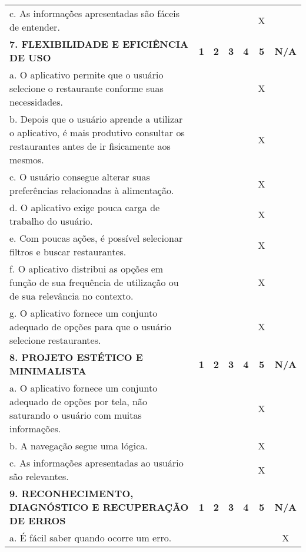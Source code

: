 \documentclass[portuguese,oneside]{tcc}
\begin{document}
\begin{center}
\begin{longtabu}{|L{25em}|c|c|c|c|c|c|}
																											c. As informações apresentadas são fáceis de entender. & & & & & X & \\ 
																											\textbf{7. FLEXIBILIDADE E EFICIÊNCIA DE USO} & \textbf{1} & \textbf{2} & \textbf{3} & \textbf{4} & \textbf{5} & \textbf{N/A} \\ 
																											a. O aplicativo permite que o usuário selecione o restaurante conforme suas necessidades. & & & & & X & \\ 
																											b. Depois que o usuário aprende a utilizar o aplicativo, é mais produtivo consultar os restaurantes antes de ir fisicamente aos mesmos. & & & & & X & \\ 
																											c. O usuário consegue alterar suas preferências relacionadas à alimentação. & & & & & X & \\ 
																											d. O aplicativo exige pouca carga de trabalho do usuário. & & & & & X & \\ 
																											e. Com poucas ações, é possível selecionar filtros e buscar restaurantes. & & & & & X & \\ 
																											f. O aplicativo distribui as opções em função de sua frequência de utilização ou de sua relevância no contexto.	& & & & & X & \\ 
																											g. O aplicativo fornece um conjunto adequado de opções para que o usuário selecione restaurantes. & & & & & X & \\ 
																											\textbf{8. PROJETO ESTÉTICO E MINIMALISTA} & \textbf{1} & \textbf{2} & \textbf{3} & \textbf{4} & \textbf{5} & \textbf{N/A} \\ 
																											a. O aplicativo fornece um conjunto adequado de opções por tela, não saturando o usuário com muitas informações. & & & & & X & \\ 
																											b. A navegação segue uma lógica. & & & & & X & \\ 
																											c. As informações apresentadas ao usuário são relevantes. & & & & & X & \\ 
																											\textbf{9. RECONHECIMENTO, DIAGNÓSTICO E RECUPERAÇÃO DE ERROS} & \textbf{1} & \textbf{2} & \textbf{3} & \textbf{4} & \textbf{5} & \textbf{N/A} \\ 
																											a. É fácil saber quando ocorre um erro.	& & & & & & X \\ 

\end{longtabu}
\end{center}
\end{document}

